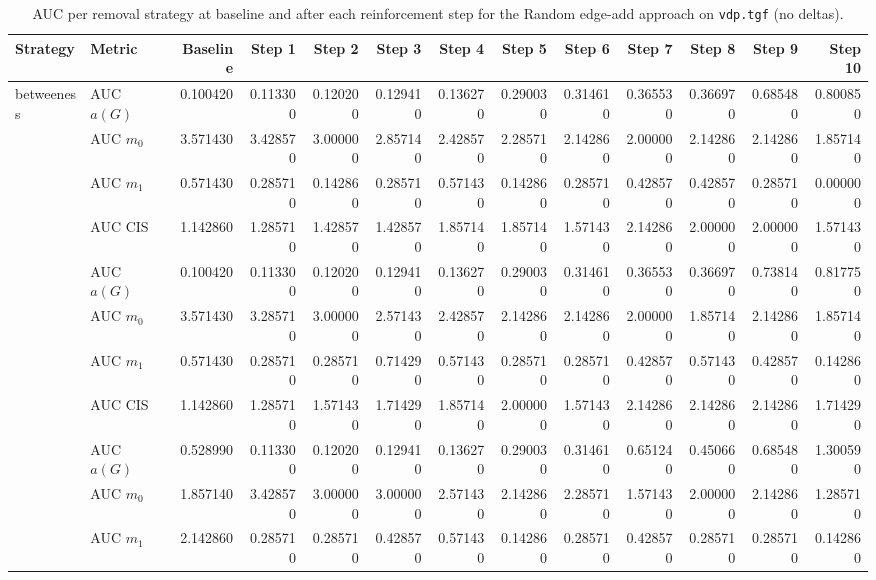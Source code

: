 \begin{table}[htbp]
  \centering
  \caption{AUC per removal strategy at baseline and after each reinforcement step for the Random edge-add approach on \texttt{vdp.tgf} (no deltas).}
  \label{tab:vdp-random_add-auc}
\setlength{\tabcolsep}{2.5pt}
  \begin{tabular}{llrrrrrrrrrrr}
    \toprule
    \textbf{Strategy} & \textbf{Metric} & \textbf{Baseline} & \textbf{Step 1} & \textbf{Step 2} & \textbf{Step 3} & \textbf{Step 4} & \textbf{Step 5} & \textbf{Step 6} & \textbf{Step 7} & \textbf{Step 8} & \textbf{Step 9} & \textbf{Step 10} \\
    \midrule
    \multirow{4}{*}{betweeness} & AUC $a(G)$ & 0.100420 & 0.113300 & 0.120200 & 0.129410 & 0.136270 & 0.290030 & 0.314610 & 0.365530 & 0.366970 & 0.685480 & 0.800850 \\
    & AUC $m_0$ & 3.571430 & 3.428570 & 3.000000 & 2.857140 & 2.428570 & 2.285710 & 2.142860 & 2.000000 & 2.142860 & 2.142860 & 1.857140 \\
    & AUC $m_1$ & 0.571430 & 0.285710 & 0.142860 & 0.285710 & 0.571430 & 0.142860 & 0.285710 & 0.428570 & 0.428570 & 0.285710 & 0.000000 \\
    & AUC CIS & 1.142860 & 1.285710 & 1.428570 & 1.428570 & 1.857140 & 1.857140 & 1.571430 & 2.142860 & 2.000000 & 2.000000 & 1.571430 \\
    \addlinespace
    \multirow{4}{*}{closeness} & AUC $a(G)$ & 0.100420 & 0.113300 & 0.120200 & 0.129410 & 0.136270 & 0.290030 & 0.314610 & 0.365530 & 0.366970 & 0.738140 & 0.817750 \\
    & AUC $m_0$ & 3.571430 & 3.285710 & 3.000000 & 2.571430 & 2.428570 & 2.142860 & 2.142860 & 2.000000 & 1.857140 & 2.142860 & 1.857140 \\
    & AUC $m_1$ & 0.571430 & 0.285710 & 0.285710 & 0.714290 & 0.571430 & 0.285710 & 0.285710 & 0.428570 & 0.571430 & 0.428570 & 0.142860 \\
    & AUC CIS & 1.142860 & 1.285710 & 1.571430 & 1.714290 & 1.857140 & 2.000000 & 1.571430 & 2.142860 & 2.142860 & 2.142860 & 1.714290 \\
    \addlinespace
    \multirow{4}{*}{core influence} & AUC $a(G)$ & 0.528990 & 0.113300 & 0.120200 & 0.129410 & 0.136270 & 0.290030 & 0.314610 & 0.651240 & 0.450660 & 0.685480 & 1.300590 \\
    & AUC $m_0$ & 1.857140 & 3.428570 & 3.000000 & 3.000000 & 2.571430 & 2.142860 & 2.285710 & 1.571430 & 2.000000 & 2.142860 & 1.285710 \\
    & AUC $m_1$ & 2.142860 & 0.285710 & 0.285710 & 0.428570 & 0.571430 & 0.142860 & 0.285710 & 0.428570 & 0.285710 & 0.285710 & 0.142860 \\

\end{tabular}
\end{table}
